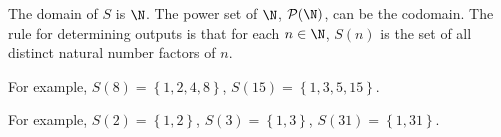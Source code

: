 \begin{list}{\bf{\ref{exer:sec62-5}.}}
\item \begin{list}{\bf{(a)}}
\item The domain of $S$ is $\N$.  The power set of $\N$, $\mathcal{P} ( \N )$,  can be the codomain.  The rule for determining outputs is that for each $n \in \N$, 
$S(n)$ is the set of all distinct natural number factors of $n$.
\end{list}
\end{list}


\begin{list}{}
\item \begin{list}{\bf{(b)}}
\item For example,  $S( 8 ) = \left\{ {1, 2, 4, 8} \right\}$, 
$S( {15} ) = \left\{ {1, 3, 5, 15} \right\}$.
\end{list}
\end{list}
%
\begin{list}{}
\item \begin{list}{\bf{(c)}}
\item For example, $S( 2 ) = \left\{ {1, 2} \right\}$, 
$S( 3 ) = \left\{ {1, 3} \right\}$, 
$S( {31} ) = \left\{ {1, 31} \right\}$.
\end{list}
\end{list}

%

\hbreak
\renewcommand{\labelenumi}{\textbf{\arabic{enumi}.}}

\endinput



